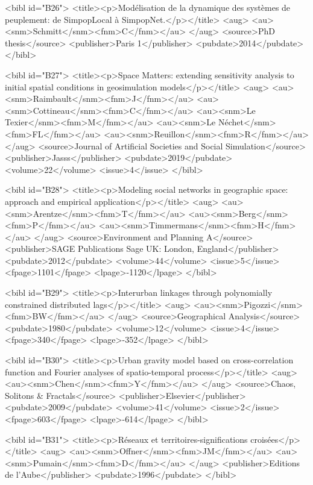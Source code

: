 \documentclass{bmcart}
\begin{document}
\begin{backmatter}
{<bibl id="B26">
  <title><p>Mod{\'e}lisation de la dynamique des syst{\`e}mes de peuplement: de
  SimpopLocal {\`a} SimpopNet.</p></title>
  <aug>
    <au><snm>Schmitt</snm><fnm>C</fnm></au>
  </aug>
  <source>PhD thesis</source>
  <publisher>Paris 1</publisher>
  <pubdate>2014</pubdate>
</bibl>

<bibl id="B27">
  <title><p>Space Matters: extending sensitivity analysis to initial spatial
  conditions in geosimulation models</p></title>
  <aug>
    <au><snm>Raimbault</snm><fnm>J</fnm></au>
    <au><snm>Cottineau</snm><fnm>C</fnm></au>
    <au><snm>Le Texier</snm><fnm>M</fnm></au>
    <au><snm>Le N{\'e}chet</snm><fnm>FL</fnm></au>
    <au><snm>Reuillon</snm><fnm>R</fnm></au>
  </aug>
  <source>Journal of Artificial Societies and Social Simulation</source>
  <publisher>Jasss</publisher>
  <pubdate>2019</pubdate>
  <volume>22</volume>
  <issue>4</issue>
</bibl>

<bibl id="B28">
  <title><p>Modeling social networks in geographic space: approach and
  empirical application</p></title>
  <aug>
    <au><snm>Arentze</snm><fnm>T</fnm></au>
    <au><snm>Berg</snm><fnm>P</fnm></au>
    <au><snm>Timmermans</snm><fnm>H</fnm></au>
  </aug>
  <source>Environment and Planning A</source>
  <publisher>SAGE Publications Sage UK: London, England</publisher>
  <pubdate>2012</pubdate>
  <volume>44</volume>
  <issue>5</issue>
  <fpage>1101</fpage>
  <lpage>-1120</lpage>
</bibl>

<bibl id="B29">
  <title><p>Interurban linkages through polynomially constrained distributed
  lags</p></title>
  <aug>
    <au><snm>Pigozzi</snm><fnm>BW</fnm></au>
  </aug>
  <source>Geographical Analysis</source>
  <pubdate>1980</pubdate>
  <volume>12</volume>
  <issue>4</issue>
  <fpage>340</fpage>
  <lpage>-352</lpage>
</bibl>

<bibl id="B30">
  <title><p>Urban gravity model based on cross-correlation function and Fourier
  analyses of spatio-temporal process</p></title>
  <aug>
    <au><snm>Chen</snm><fnm>Y</fnm></au>
  </aug>
  <source>Chaos, Solitons \& Fractals</source>
  <publisher>Elsevier</publisher>
  <pubdate>2009</pubdate>
  <volume>41</volume>
  <issue>2</issue>
  <fpage>603</fpage>
  <lpage>-614</lpage>
</bibl>

<bibl id="B31">
  <title><p>R{\'e}seaux et territoires-significations crois{\'e}es</p></title>
  <aug>
    <au><snm>Offner</snm><fnm>JM</fnm></au>
    <au><snm>Pumain</snm><fnm>D</fnm></au>
  </aug>
  <publisher>Editions de l'Aube</publisher>
  <pubdate>1996</pubdate>
</bibl>

}
\end{backmatter}
\end{document}
